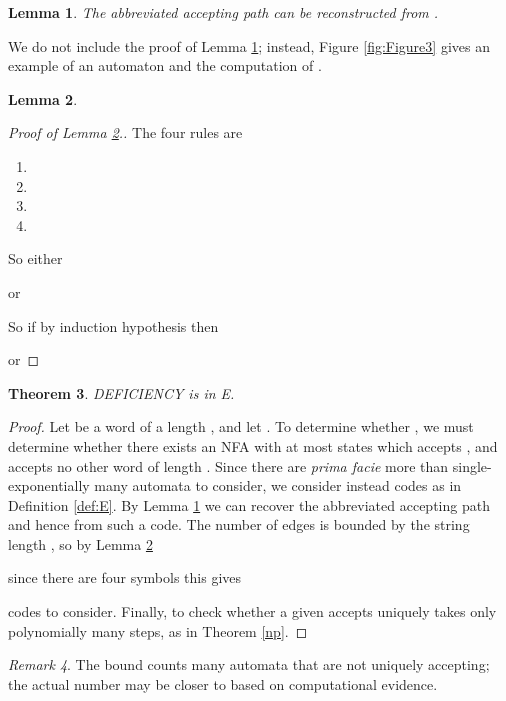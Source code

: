 \documentclass[12pt]{article}
\theoremstyle{plain}
\newtheorem{thm}{Theorem}
\newtheorem{lem}[thm]{Lemma}
\theoremstyle{definition}
\theoremstyle{remark}
\newtheorem{rem}[thm]{Remark}
\begin{document}
			\begin{lem}\label{reconstructed}
				The abbreviated accepting path can be reconstructed from .
			\end{lem}
			We do not include the proof of Lemma \ref{reconstructed};
			instead, Figure \ref{fig:Figure3} gives an example of an automaton and the computation of .
			\begin{lem}\label{easy}
				
			\end{lem}
			\begin{proof}[Proof of Lemma \ref{easy}.]
				The four rules are
				\begin{enumerate}
					\item{} 
					\item{} 
					\item{} 
					\item{} 
				\end{enumerate}
				So either
				
				or
				
				So if by induction hypothesis  then
				
				or
				
			\end{proof}
			\begin{thm}\label{singly}
	 			\textsc{DEFICIENCY} is in E.
			\end{thm}
			\begin{proof}
				Let  be a word of a length , and let . To determine whether ,
				we must determine whether there exists an NFA  with at most  states
				which accepts , and accepts no other word of length .
				Since there are \emph{prima facie} more than single-exponentially many automata to consider,
				we consider instead codes  as in Definition \ref{def:E}.
				By Lemma \ref{reconstructed} we can recover the abbreviated accepting path  and hence  from such a code.
				The number of edges  is bounded by the string length , so by Lemma \ref{easy}
				
				since there are four symbols this gives
				
				codes to consider.
				Finally, to check whether a given  accepts uniquely takes only polynomially many steps, as in Theorem \ref{np}.
			\end{proof}
			\begin{rem}
				The bound  counts many automata that are not uniquely accepting; the actual number may be closer to  based on
				computational evidence.
			\end{rem}
\end{document}
